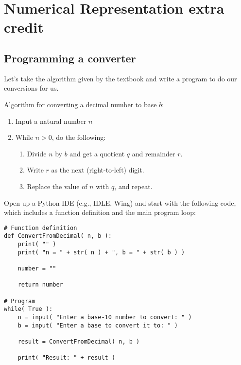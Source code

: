 \documentclass[a4paper,12pt]{book}
\title{}
\author{Rachel Morris}
\date{\today}
\begin{document}
    \togglefalse{answerkey}


    \section*{Numerical Representation extra credit}

    \subsection*{Programming a converter}

        Let's take the algorithm given by the textbook and write
        a program to do our conversions for us.
    
            \begin{intro}{Algorithm for converting a decimal number to base $b$:}
                \begin{enumerate}
                    \item   Input a natural number $n$
                    \item   While $n > 0$, do the following:
                        \begin{enumerate}
                            \item   Divide $n$ by $b$ and get a quotient $q$ and remainder $r$.
                            \item   Write $r$ as the next (right-to-left) digit.
                            \item   Replace the value of $n$ with $q$, and repeat.
                        \end{enumerate}
                \end{enumerate}
            \end{intro}

        Open up a Python IDE (e.g., IDLE, Wing) and start with the following code,
        which includes a function definition and the main program loop:

\begin{lstlisting}[style=pycode]
# Function definition
def ConvertFromDecimal( n, b ):
    print( "" )
    print( "n = " + str( n ) + ", b = " + str( b ) )

    number = ""

    return number

# Program
while( True ):
    n = input( "Enter a base-10 number to convert: " )
    b = input( "Enter a base to convert it to: " )

    result = ConvertFromDecimal( n, b )

    print( "Result: " + result )
\end{lstlisting}
\end{document}
